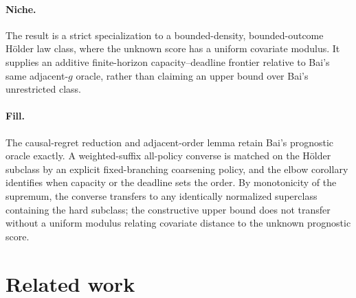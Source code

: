 \documentclass{article}
\begin{document}
\paragraph{Niche.} The result is a strict specialization to a bounded-density, bounded-outcome Hölder law class, where the unknown score has a uniform covariate modulus. It supplies an additive finite-horizon capacity--deadline frontier relative to Bai's same adjacent-\(g\) oracle, rather than claiming an upper bound over Bai's unrestricted class.

\paragraph{Fill.} The causal-regret reduction and adjacent-order lemma retain Bai's prognostic oracle exactly. A weighted-suffix all-policy converse is matched on the Hölder subclass by an explicit fixed-branching coarsening policy, and the elbow corollary identifies when capacity or the deadline sets the order. By monotonicity of the supremum, the converse transfers to any identically normalized superclass containing the hard subclass; the constructive upper bound does not transfer without a uniform modulus relating covariate distance to the unknown prognostic score.

\section{Related work}
\end{document}
